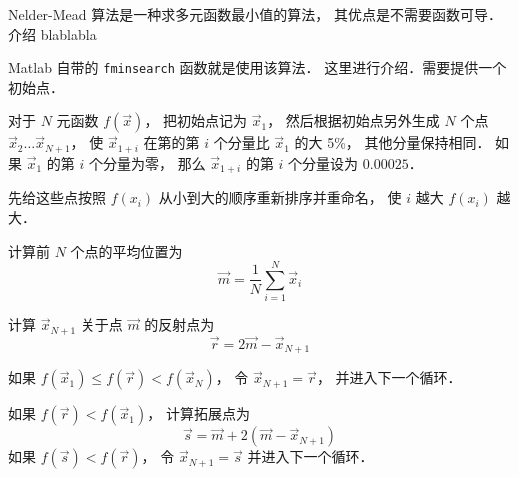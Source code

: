 

Nelder-Mead 算法是一种求多元函数最小值的算法， 其优点是不需要函数可导． 介绍 blablabla

Matlab 自带的 \texttt{fminsearch} 函数就是使用该算法． 这里进行介绍．需要提供一个初始点．

对于 $N$ 元函数 $f(\vec x)$， 把初始点记为 $\vec x_1$， 然后根据初始点另外生成 $N$ 个点 $\vec x_2\dots\vec x_{N + 1}$， 使 $\vec x_{1 + i}$ 在第的第 $i$ 个分量比 $\vec x_1$ 的大 5\%， 其他分量保持相同． 如果 $\vec x_1$ 的第 $i$ 个分量为零， 那么 $\vec x_{1 + i}$ 的第 $i$ 个分量设为 $0.00025$．

先给这些点按照 $f(x_i)$ 从小到大的顺序重新排序并重命名， 使 $i$ 越大 $f(x_i)$ 越大．

计算前 $N$ 个点的平均位置为
\begin{equation}
\vec m = \frac 1N \sum_{i=1}^N \vec x_i
\end{equation}


计算 $\vec x_{N + 1}$ 关于点 $\vec m$ 的反射点为
\begin{equation}
\vec r = 2\vec m - \vec x_{N + 1}
\end{equation}

如果 $f(\vec x_1) \le f(\vec r) < f(\vec x_N)$， 令 $\vec x_{N+1} = \vec r$， 并进入下一个循环．

如果 $f(\vec r) < f(\vec x_1)$， 计算拓展点为
\begin{equation}
\vec s = \vec m + 2(\vec m - \vec x_{N+1})
\end{equation}
如果 $f(\vec s) < f(\vec r)$， 令 $\vec x_{N+1} = \vec s$ 并进入下一个循环．